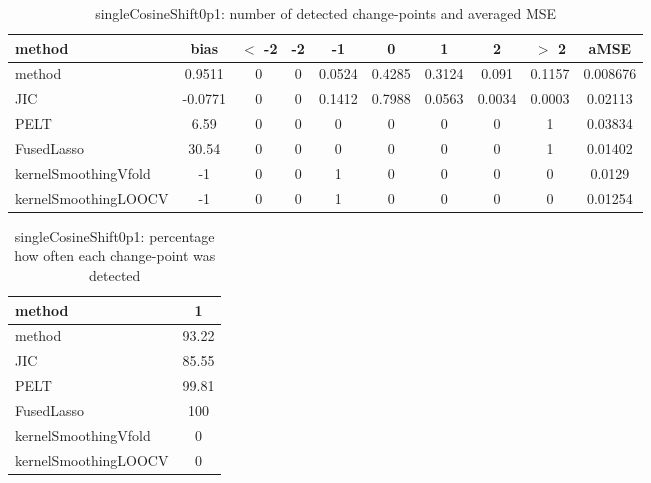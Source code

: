 \begin{table}[ht]
\centering
\begin{tabular}{l|c|ccccccc|c}
  \hline
method & bias & $<$ -2 & -2 & -1 & 0 & 1 & 2 & $>$ 2 & aMSE \\ 
  \hline
method & 0.9511 &     0 &     0 & 0.0524 & 0.4285 & 0.3124 & 0.091 & 0.1157 & 0.008676 \\ 
  JIC & -0.0771 &     0 &     0 & 0.1412 & 0.7988 & 0.0563 & 0.0034 & 0.0003 & 0.02113 \\ 
  PELT &  6.59 &     0 &     0 &     0 &     0 &     0 &     0 &     1 & 0.03834 \\ 
  FusedLasso & 30.54 &     0 &     0 &     0 &     0 &     0 &     0 &     1 & 0.01402 \\ 
  kernelSmoothingVfold &    -1 &     0 &     0 &     1 &     0 &     0 &     0 &     0 & 0.0129 \\ 
  kernelSmoothingLOOCV &    -1 &     0 &     0 &     1 &     0 &     0 &     0 &     0 & 0.01254 \\ 
   \hline
\end{tabular}
\caption{singleCosineShift0p1: number of detected change-points and averaged MSE} 
\label{tab:singleCosineShift0p1Njumps}
\end{table}
\begin{table}[ht]
\centering
\begin{tabular}{l|c}
  \hline
method & 1 \\ 
  \hline
method &  93.22 \\ 
  JIC &  85.55 \\ 
  PELT &  99.81 \\ 
  FusedLasso &    100 \\ 
  kernelSmoothingVfold &      0 \\ 
  kernelSmoothingLOOCV &      0 \\ 
   \hline
\end{tabular}
\caption{singleCosineShift0p1: percentage how often each change-point was detected} 
\label{tab:singleCosineShift0p1Detections}
\end{table}
